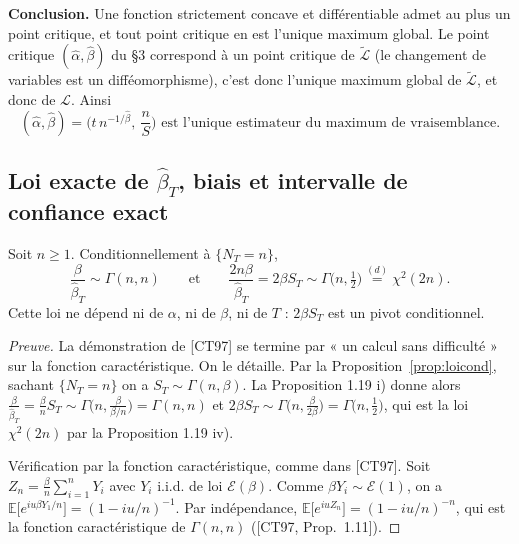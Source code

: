 \medskip
\noindent\textbf{Conclusion.} Une fonction strictement concave et différentiable
admet au plus un point critique, et tout point critique en est l'unique maximum global.
Le point critique $(\hat\alpha,\hat\beta)$ du §3 correspond à un point critique de
$\widetilde{\mathcal{L}}$ (le changement de variables est un difféomorphisme),
c'est donc l'unique maximum global de $\widetilde{\mathcal{L}}$, et donc de $\mathcal{L}$. Ainsi
\[
  \boxed{(\hat\alpha,\hat\beta)=\Big(t\,n^{-1/\hat\beta},\ \frac{n}{S}\Big)
  \text{ est l'unique estimateur du maximum de vraisemblance.}}
\]

\subsection{Loi exacte de $\hat\beta_T$, biais et intervalle de confiance exact}\label{sec:exact}

\begin{proposition}[{[CT97, Prop.~3.5]}]\label{prop:loiexacte}
Soit $n\ge1$. Conditionnellement à $\{N_T=n\}$,
\[
\frac{\beta}{\hat\beta_T}\sim\Gamma(n,n)
\qquad\text{et}\qquad
\frac{2n\beta}{\hat\beta_T}=2\beta S_T\sim\Gamma\big(n,\tfrac12\big)\overset{(d)}{=}\chi^2(2n).
\]
Cette loi ne dépend ni de $\alpha$, ni de $\beta$, ni de $T$ : $2\beta S_T$ est un pivot conditionnel.
\end{proposition}

\begin{proof}[Preuve]
La démonstration de [CT97] se termine par « un calcul sans difficulté » sur la fonction caractéristique. On le détaille. Par la Proposition~\ref{prop:loicond}, sachant $\{N_T=n\}$ on a $S_T\sim\Gamma(n,\beta)$. La Proposition 1.19 i) donne alors $\frac{\beta}{\hat\beta_T}=\frac{\beta}{n}S_T\sim\Gamma\big(n,\frac{\beta}{\beta/n}\big)=\Gamma(n,n)$ et $2\beta S_T\sim\Gamma\big(n,\frac{\beta}{2\beta}\big)=\Gamma\big(n,\frac12\big)$, qui est la loi $\chi^2(2n)$ par la Proposition 1.19 iv).

Vérification par la fonction caractéristique, comme dans [CT97]. Soit $Z_n=\frac{\beta}{n}\sum_{i=1}^nY_i$ avec $Y_i$ i.i.d. de loi $\mathcal{E}(\beta)$. Comme $\beta Y_i\sim\mathcal{E}(1)$, on a $\mathbb{E}\big[e^{iu\beta Y_1/n}\big]=(1-iu/n)^{-1}$. Par indépendance, $\mathbb{E}\big[e^{iuZ_n}\big]=(1-iu/n)^{-n}$, qui est la fonction caractéristique de $\Gamma(n,n)$ ([CT97, Prop.~1.11]).
\end{proof}


